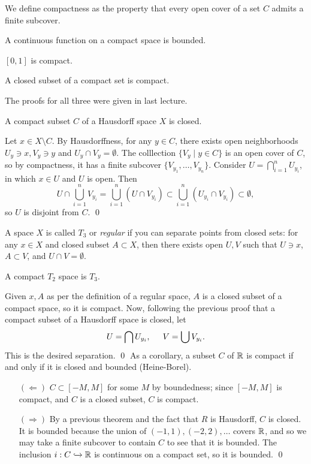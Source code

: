 \noindent We define compactness as the property that every open cover of a set $C$ admits a finite subcover.
\begin{simplethm}
    A continuous function on a compact space is bounded.
\end{simplethm}
\begin{simplethm}
    $[0, 1]$ is compact.
\end{simplethm}
\begin{simplethm}
    A closed subset of a compact set is compact.
\end{simplethm}
\noindent The proofs for all three were given in last lecture.
\begin{simplethm}
    A compact subset $C$ of a Hausdorff space $X$ is closed.
\end{simplethm}
\noindent Let $x \in X \setminus C$. By Hausdorffness, for any $y \in C$, there exists open neighborhoods $U_y \ni x, V_y \ni y$ and $U_y \cap V_y = \emptyset$. The colllection $\{V_y \mid y \in C\}$ is an open cover of $C$, so by compactness, it has a finite subcover $\{V_{y_1}, \dots, V_{y_n}\}$. Consider $U = \bigcap_{i=1}^n U_{y_i}$, in which $x \in U$ and $U$ is open. Then
\[ U \cap \bigcup_{i=1}^n V_{y_i} = \bigcup_{i=1}^n (U \cap V_{y_i}) \subset \bigcup_{i=1}^n (U_{y_i} \cap V_{y_i}) \subset \emptyset, \]
so $U$ is disjoint from $C$. \qed
\begin{definition}[Regular / $T_3$]
    A space $X$ is called $T_3$ or \textit{regular} if you can separate points from closed sets: for any $x \in X$ and closed subset $A \subset X$, then there exists open $U, V$ such that $U \ni x$, $A \subset V$, and $U \cap V = \emptyset$.
\end{definition}
\begin{simplethm}
    A compact $T_2$ space is $T_3$.
\end{simplethm}
\noindent Given $x, A$ as per the definition of a regular space, $A$ is a closed subset of a compact space, so it is compact. Now, following the previous proof that a compact subset of a Hausdorff space is closed, let
\[ U = \bigcap U_{y_i}, \hspace{0.2in} V = \bigcup V_{y_i}. \]
This is the desired separation. \qed 
\medskip\newline
\noindent As a corollary, a subset $C$ of $\mathbb R$ is compact if and only if it is closed and bounded (Heine-Borel).
\begin{itemize}
    \item[$(\Leftarrow)$] $C \subset [-M, M]$ for some $M$ by boundedness; since $[-M, M]$ is compact, and $C$ is a closed subset, $C$ is compact.
    \item[$(\Rightarrow)$] By a previous theorem and the fact that $R$ is Hausdorff, $C$ is closed. It is bounded because the union of $(-1, 1), (-2, 2), \dots$ covers $\mathbb R$, and so we may take a finite subcover to contain $C$ to see that it is bounded. The inclusion $i : C \xhookrightarrow{} \mathbb R$ is continuous on a compact set, so it is bounded. \qed
\end{itemize}
